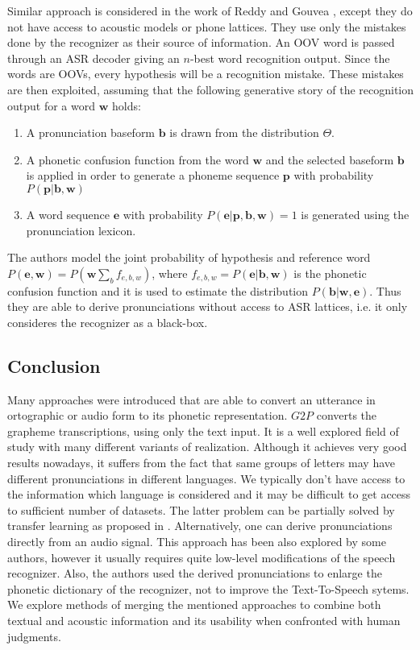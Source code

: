 Similar approach is considered in the work of Reddy and Gouvea \cite{reddy2011learning}, except they do not have access to acoustic models or phone lattices.
They use only the mistakes done by the recognizer as their source of information.
An OOV word is passed through an ASR decoder giving an $n$-best word recognition output.
Since the words are OOVs, every hypothesis will be a recognition mistake.
These mistakes are then exploited, assuming that the following generative story of the recognition output
for a word $\mathbf{w}$ holds:
\begin{enumerate}
\item A pronunciation baseform $\mathbf{b}$ is drawn from the distribution $\Theta$.
\item A phonetic confusion function from the word $\mathbf{w}$ and the selected baseform $\mathbf{b}$ is applied in order to generate a phoneme sequence $\mathbf{p}$ with probability $P(\mathbf{p}|\mathbf{b},\mathbf{w})$
\item A word sequence $\mathbf{e}$ with probability $P (\mathbf{e} \vert \mathbf{p},\mathbf{b},\mathbf{w}) = 1$ 
is generated using the pronunciation lexicon.
\end{enumerate}
The authors model the joint probability of hypothesis and reference word $P(\mathbf{e}, \mathbf{w}) = P(\mathbf{w}\sum_b f_{e,b,w})$, where $f_{e,b,w} = P(\mathbf{e}\vert \mathbf{b}, \mathbf{w})$ is the phonetic confusion function and it is used to estimate the distribution $P(\mathbf{b}\vert\mathbf{w},\mathbf{e})$.
Thus they are able to derive pronunciations without access to ASR lattices, i.e. it only consideres the recognizer as a black-box. 
\subsection{Conclusion}
Many approaches were introduced that are able to convert an utterance in ortographic or audio form to its phonetic representation.
$G2P$ converts the grapheme transcriptions, using only the text input.
It is a well explored field of study with many different variants of realization.
Although it achieves very good results nowadays, it suffers from the fact that same groups of letters may have different pronunciations in different languages.
We typically don't have access to the information which language is considered and it may be difficult to get access to sufficient number of datasets.
The latter problem can be partially solved by transfer learning as proposed in \cite{deri2016grapheme}.
\linebreak\linebreak
Alternatively, one can derive pronunciations directly from an audio signal.
This approach has been also explored by some authors, however it usually requires quite low-level modifications of the speech recognizer.
Also, the authors used the derived pronunciations to enlarge the phonetic dictionary of the recognizer, not to improve the Text-To-Speech sytems.
We explore methods of merging the mentioned approaches to combine both textual and acoustic information and its usability when confronted with human judgments.